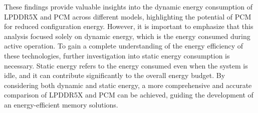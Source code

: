     
These findings provide valuable insights into the dynamic energy consumption of LPDDR5X and PCM across different models, highlighting the potential of PCM for reduced configuration energy.
However, it is important to emphasize that this analysis focused solely on dynamic energy, which is the energy consumed during active operation.
To gain a complete understanding of the energy efficiency of these technologies, further investigation into static energy consumption is necessary.
Static energy refers to the energy consumed even when the system is idle, and it can contribute significantly to the overall energy budget.
By considering both dynamic and static energy, a more comprehensive and accurate comparison of LPDDR5X and PCM can be achieved, guiding the development of an energy-efficient memory solutions.